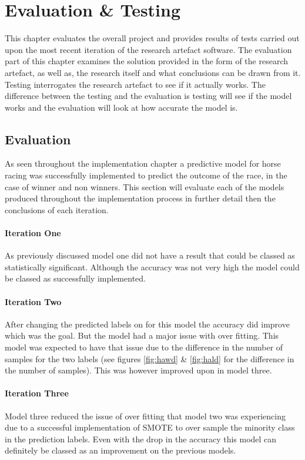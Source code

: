 \chapter{Evaluation \& Testing}\label{ch:Evaluation}

This chapter evaluates the overall project and provides results of tests carried out upon the most recent iteration of the research artefact software. The evaluation part of this chapter examines the solution provided in the form of the research artefact, as well as, the research itself and what conclusions can be drawn from it. Testing interrogates the research artefact to see if it actually works. The difference between the testing and the evaluation is testing will see if the model works and the evaluation will look at how accurate the model is.  

\section{Evaluation}
As seen throughout the implementation chapter a predictive model for horse racing was successfully implemented to predict the outcome of the race, in the case of winner and non winners. This section will evaluate each of the models produced throughout the implementation process in further detail then the conclusions of each iteration.

\subsubsection{Iteration One}
As previously discussed model one did not have a result that could be classed as statistically significant. Although the accuracy was not very high the model could be classed as successfully implemented.
\subsubsection{Iteration Two}
After changing the predicted labels on for this model the accuracy did improve which was the goal. But the model had a major issue with over fitting. This model was expected to have that issue due to the difference in the number of samples for the two labels (see figures \ref{fig:hawd} \& \ref{fig:hald} for the difference in the number of samples). This was however improved upon in model three.
\subsubsection{Iteration Three}
Model three reduced the issue of over fitting that model two was experiencing due to a successful implementation of SMOTE to over sample the minority class in the prediction labels. Even with the drop in the accuracy this model can definitely be classed as an improvement on the previous models.  
